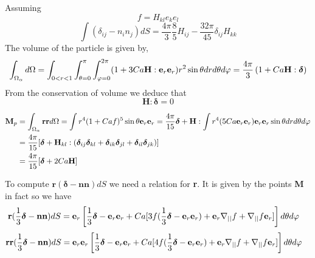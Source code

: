 Assuming 
\begin{equation}
    f = H_{kl} e_ke_l
\end{equation}
\begin{equation}
    \int (\delta_{ij} - n_in_j) dS 
    =
    \frac{4\pi}{3}\frac{8}{5}
    H_{ij}
    - \frac{32\pi}{45}\delta_{ij} H_{kk}
\end{equation}
The volume of the particle is given by, 
\begin{equation}
    \int_{\Omega_{\alpha}}  d\Omega=
    \int_{0<r<1}
    \int_{\theta = 0}^\pi
    \int_{\varphi = 0}^{2\pi}
    (1+3 Ca \textbf{H}:\textbf{e}_r\textbf{e}_r) r^2 \sin\theta dr d\theta d\varphi
    =
    \frac{4\pi}{3}\left(
        1
        +
        Ca \textbf{H}:\bm\delta 
    \right)
\end{equation}
From the conservation of volume we deduce that
\begin{equation}
    \textbf{H}:\bm\delta 
    =
    0 
\end{equation}


\begin{align}
    \textbf{M}_p
    &=
    \int_{\Omega_{\alpha}} \textbf{rr} d\Omega
    =
    \int{r^4 (1+ Ca f)^5 \sin\theta \textbf{e}_r \textbf{e}_r }
    =
    \frac{4\pi}{15}\bm\delta+
    \textbf{H}: 
    \int{r^4 (5 Ca \textbf{e}_r \textbf{e}_r) \textbf{e}_r \textbf{e}_r }\sin\theta dr d\theta d\varphi\\
    &=
    \frac{4\pi}{15}[\bm\delta+
    \textbf{H}_{kl}: (
        \bm\delta_{ij}
        \bm\delta_{kl}
        +\bm\delta_{ik}
        \bm\delta_{jl}
        +\bm\delta_{il}
        \bm\delta_{jk}
    )
    ]\\
    &=
    \frac{4\pi}{15}[\bm\delta+
    2 Ca \textbf{H}
    ]
\end{align}

To compute $\textbf{r}(\bm\delta - \textbf{nn})dS$ we need a relation for \textbf{r}. It is given by the points \textbf{M} in fact so we have
\begin{align}
    \textbf{r}(\frac{1}{3}\bm\delta - \textbf{nn}) dS
    &=
    \textbf{e}_r
    \left[
        \frac{1}{3}\bm\delta   
        - \textbf{e}_r \textbf{e}_r 
        + Ca [
            3f(\frac{1}{3}\bm\delta 
            -  \textbf{e}_r \textbf{e}_r )
            + \textbf{e}_r \mathbf{\nabla}_{||} f 
            + \mathbf{\nabla}_{||} f \textbf{e}_r 
            ]
    \right]d\theta d\varphi
\end{align}
\begin{align}
    \textbf{rr}(\frac{1}{3}\bm\delta - \textbf{nn}) dS
    &= \textbf{e}_r \textbf{e}_r
    \left[
        \frac{1}{3}\bm\delta   
        - \textbf{e}_r \textbf{e}_r 
        + Ca [
            4f(\frac{1}{3}\bm\delta 
            -  \textbf{e}_r \textbf{e}_r )
            + \textbf{e}_r \mathbf{\nabla}_{||} f 
            + \mathbf{\nabla}_{||} f \textbf{e}_r 
            ]
    \right]d\theta d\varphi
\end{align}

